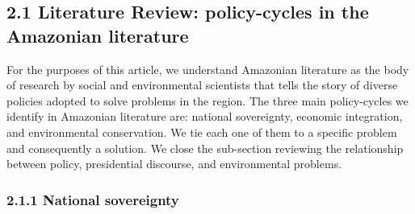 \documentclass[]{interact}
\theoremstyle{plain}%
\theoremstyle{definition}
\theoremstyle{remark}
\begin{document}
\hypertarget{literature-review-policy-cycles-in-the-amazonian-literature}{%
\subsection{2.1 Literature Review: policy-cycles in the Amazonian
literature}\label{literature-review-policy-cycles-in-the-amazonian-literature}}

For the purposes of this article, we understand Amazonian literature as
the body of research by social and environmental scientists that tells
the story of diverse policies adopted to solve problems in the region.
The three main policy-cycles we identify in Amazonian literature are:
national sovereignty, economic integration, and environmental
conservation. We tie each one of them to a specific problem and
consequently a solution. We close the sub-section reviewing the
relationship between policy, presidential discourse, and environmental
problems.

\hypertarget{national-sovereignty}{%
\subsubsection{2.1.1 National sovereignty}\label{national-sovereignty}}
\end{document}
